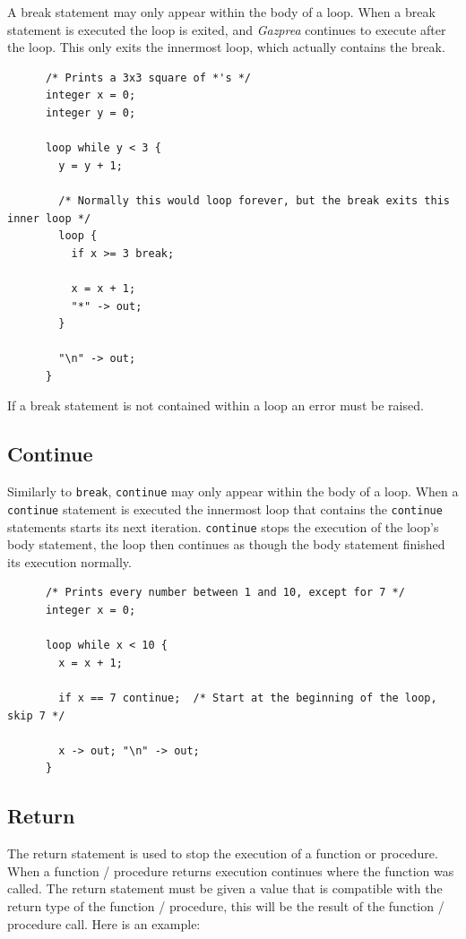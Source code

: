 \documentclass{article}
\begin{document}
    A break statement may only appear within the body of a loop. When a break statement is executed the loop is
    exited, and \textit{Gazprea} continues to execute after the loop. This only exits the innermost loop, which
    actually contains the break.

    \begin{lstlisting}
      /* Prints a 3x3 square of *'s */
      integer x = 0;
      integer y = 0;

      loop while y < 3 {
        y = y + 1;

        /* Normally this would loop forever, but the break exits this inner loop */
        loop {
          if x >= 3 break;

          x = x + 1;
          "*" -> out;
        }

        "\n" -> out;
      }
    \end{lstlisting}

    If a break statement is not contained within a loop an error must be raised.

  \subsection{Continue}\label{sec:continue}


    Similarly to \texttt{break}, \texttt{continue} may only appear within the body of a loop. When a
    \texttt{continue} statement is executed the innermost loop that contains the \texttt{continue} statements starts
    its next iteration.  \texttt{continue} stops the execution of the loop's body statement, the loop then continues
    as though the body statement finished its execution normally.

    \begin{lstlisting}
      /* Prints every number between 1 and 10, except for 7 */
      integer x = 0;

      loop while x < 10 {
        x = x + 1;

        if x == 7 continue;  /* Start at the beginning of the loop, skip 7 */

        x -> out; "\n" -> out;
      }
    \end{lstlisting}


  \subsection{Return}\label{sec:return}

    The return statement is used to stop the execution of a function or procedure.  When a function / procedure
    returns execution continues where the function was called. The return statement must be given a value that is
    compatible with the return type of the function / procedure, this will be the result of the function / procedure
    call. Here is an example:
\end{document}
